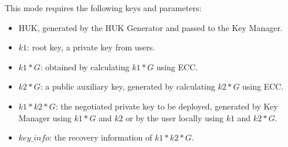 \documentclass[main\_\_EN.tex]{subfiles}
\begin{document}
This mode requires the following keys and parameters:
\begin{itemize}
    \item HUK, generated by the HUK Generator and passed to the Key Manager.
    \item \begin{math}k1\end{math}: root key, a private key from users.
    \item \begin{math}k1*G\end{math}: obtained by calculating \begin{math}k1*G\end{math} using ECC.
    \item \begin{math}k2*G\end{math}: a public auxiliary key, generated by calculating \begin{math}k2*G\end{math} using ECC.
    \item \begin{math}k1*k2*G\end{math}: the negotiated private key to be deployed, generated by Key Manager using \begin{math}k1*G\end{math} and  \begin{math}k2\end{math} or by the user locally using \begin{math}k1\end{math} and \begin{math}k2*G\end{math}.
    \item \hyperref[para:keyinfo]{\begin{math}key\_info\end{math}}: the recovery information of \begin{math}k1*k2*G\end{math}.
\end{itemize}
\end{document}

